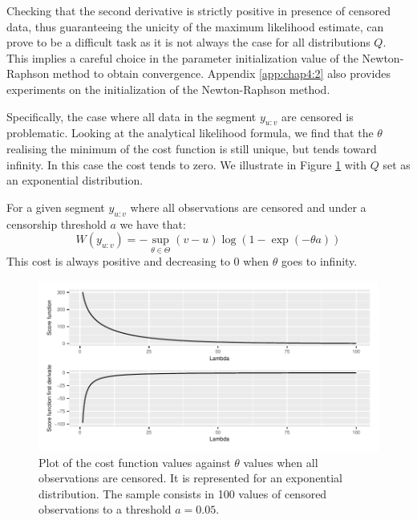 Checking that the second derivative is strictly positive in presence of censored data, thus guaranteeing the unicity of the maximum likelihood estimate, can prove to be a difficult task as it is not always the case for all distributions $Q$. 
This implies a careful choice in the parameter initialization value of the Newton-Raphson method to obtain convergence. Appendix \ref{app:chap4:2} also provides experiments on the initialization of the Newton-Raphson method. 

Specifically, the case where all data in the segment $y_{u:v}$ are censored is problematic. Looking at the analytical likelihood formula, we find that the $\theta$ realising the minimum of the cost function is still unique, but tends toward infinity. In this case the cost tends to zero. We illustrate in Figure \ref{fig:onlycens} with $Q$ set as an exponential distribution. 

For a given segment $y_{u:v}$ where all observations are censored and under a censorship threshold $a$ we have that: 
\begin{equation} \label{chp:4:costex}
W(y_{u:v}) = -\sup_{\theta \in \Theta}(v-u)\log(1-\exp(-\theta a)) 
\end{equation}
This cost is always positive and decreasing to 0 when $\theta$  goes to infinity. 

\begin{figure}[ht]
    \centering
    \includegraphics{figs/Chap4/only_cens.pdf}
    \caption{Plot of the cost function values against $\theta$ values when all observations are censored. It is represented for an exponential distribution. The sample consists in 100 values of censored observations to a threshold $a = 0.05$.}
    \label{fig:onlycens}
\end{figure}

